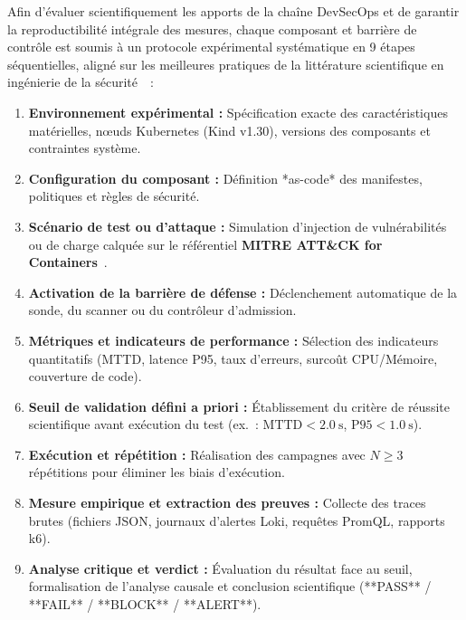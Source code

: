 Afin d'évaluer scientifiquement les apports de la chaîne DevSecOps et de garantir la reproductibilité intégrale des mesures, chaque composant et barrière de contrôle est soumis à un protocole expérimental systématique en 9 étapes séquentielles, aligné sur les meilleures pratiques de la littérature scientifique en ingénierie de la sécurité~\cite{cncf_security_whitepaper, dora_metrics_2018, myrbakken_devsecops_2017}~:

\begin{enumerate}
    \item \textbf{Environnement expérimental :} Spécification exacte des caractéristiques matérielles, nœuds Kubernetes (Kind v1.30), versions des composants et contraintes système.
    \item \textbf{Configuration du composant :} Définition *as-code* des manifestes, politiques et règles de sécurité.
    \item \textbf{Scénario de test ou d'attaque :} Simulation d'injection de vulnérabilités ou de charge calquée sur le référentiel \textbf{MITRE ATT\&CK for Containers}~\cite{mitre_attack_containers}.
    \item \textbf{Activation de la barrière de défense :} Déclenchement automatique de la sonde, du scanner ou du contrôleur d'admission.
    \item \textbf{Métriques et indicateurs de performance :} Sélection des indicateurs quantitatifs (MTTD, latence P95, taux d'erreurs, surcoût CPU/Mémoire, couverture de code).
    \item \textbf{Seuil de validation défini a priori :} Établissement du critère de réussite scientifique avant exécution du test (ex.~: $\text{MTTD} < 2.0~\text{s}$, $\text{P95} < 1.0~\text{s}$).
    \item \textbf{Exécution et répétition :} Réalisation des campagnes avec $N \ge 3$ répétitions pour éliminer les biais d'exécution.
    \item \textbf{Mesure empirique et extraction des preuves :} Collecte des traces brutes (fichiers JSON, journaux d'alertes Loki, requêtes PromQL, rapports k6).
    \item \textbf{Analyse critique et verdict :} Évaluation du résultat face au seuil, formalisation de l'analyse causale et conclusion scientifique (**PASS** / **FAIL** / **BLOCK** / **ALERT**).
\end{enumerate}


